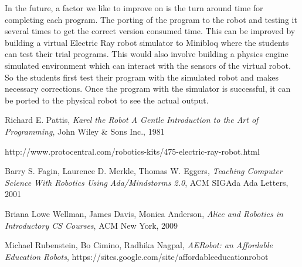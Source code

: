 \documentclass[conference]{IEEEtran}
\begin{document}
In the future, a factor we like to improve on is the turn around time for completing each program. The porting of the program to the robot and testing it several times to get the correct version consumed time. This can be improved by building a virtual Electric Ray robot simulator to Minibloq where the students can test their trial programs. This would also involve building a physics engine simulated environment which can interact with the sensors of the virtual robot. So the students first test their program with the simulated robot and makes necessary corrections. Once the program with the simulator is successful, it can be ported to the physical robot to see the actual output.


\begin{thebibliography}{1}

 Richard E. Pattis, \emph{Karel the Robot A Gentle Introduction to the Art of Programming}, John Wiley \& Sons Inc., 1981

 http://www.protocentral.com/robotics-kits/475-electric-ray-robot.html

 Barry S. Fagin, Laurence D. Merkle, Thomas W. Eggers, \emph{Teaching Computer Science With Robotics Using Ada/Mindstorms 2.0}, ACM SIGAda Ada Letters, 2001

 Briana Lowe Wellman, James Davis, Monica Anderson, \emph{Alice and Robotics in Introductory CS Courses}, ACM New York, 2009

 Michael Rubenstein, Bo Cimino, Radhika Nagpal, \emph{AERobot: an Affordable Education Robots}, https://sites.google.com/site/affordableeducationrobot

\end{thebibliography}
\end{document}
